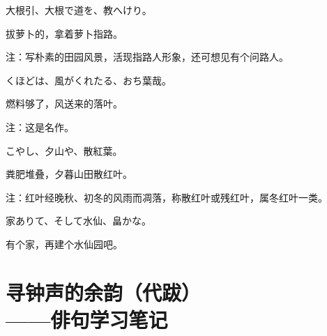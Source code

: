 \begin{haiku}
    {\FH 大根引、大根で道を、教へけり。}

    {\FK 拔萝卜的，拿着萝卜指路。}

    {\FT 注：写朴素的田园风景，活现指路人形象，还可想见有个问路人。}
\end{haiku}

\begin{haiku}
    {\FH {}くほどは、風がくれたる、おち葉哉。}

    {\FK 燃料够了，风送来的落叶。}

    {\FT 注：这是名作。}
\end{haiku}

\begin{haiku}
    {\FH こやし、夕山や、散紅葉。}

    {\FK 粪肥堆叠，夕暮山田散红叶。}

    {\FT 注：红叶经晚秋、初冬的风雨而凋落，称散红叶或残红叶，属冬红叶一类。}
\end{haiku}

\begin{haiku}
    {\FH 家ありて、そして水仙、畠かな。}

    {\FK 有个家，再建个水仙园吧。}
\end{haiku}

\chapter[{\FS 寻钟声的余韵（代跋）}]{\FS 寻钟声的余韵（代跋）\\\hspace{2em}——俳句学习笔记}

